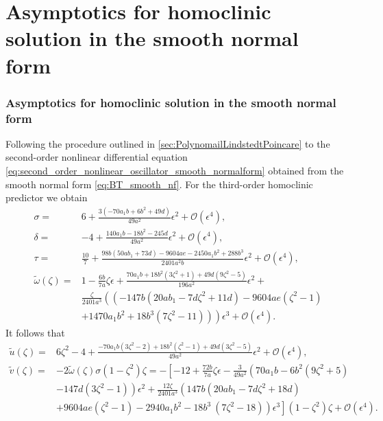 \ifthesis
\section{Asymptotics for homoclinic solution in the smooth normal form}
\else
\subsubsection{Asymptotics for homoclinic solution in the smooth normal form}
\fi
\label{sec:asymptotics-for-homoclinic-solution-for-the-smooth-normal-form}
Following the procedure outlined in \cref{sec:PolynomailLindstedtPoincare} to
the second-order nonlinear differential equation
\cref{eq:second_order_nonlinear_oscillator_smooth_normalform} obtained from the
smooth normal form \cref{eq:BT_smooth_nf}. For the third-order homoclinic
predictor we obtain
\begin{align}
				\sigma ={}& 6 + \frac{3 \left(-70 a_1 b+6 b^2+49 d\right)}{49 a^2} \epsilon^2
                    + \mathcal{O}(\epsilon^4),
				\nonumber \\
				\delta ={}& -4 + \frac{140 a_1 b-18 b^2-245 d}{49 a^2} \epsilon^2
                    + \mathcal{O}(\epsilon^4),
				\nonumber \\
				\label{eq:tau_smooth}
				\tau   ={}& \frac{10}{7} + \frac{98 b (50 a b_1+73 d)-9604 a e-2450 a_1 b^2+288 b^3}{2401 a^2 b} \epsilon^2
								+ \mathcal{O}(\epsilon^4), \\
				\tilde \omega(\zeta) ={}& 1 - \frac{6b}{7a}\zeta  \epsilon	+ 
				\frac{70 a_1 b+18 b^2 \left(3 \zeta ^2+1\right)+49 d \left(9 \zeta ^2-5\right)}{196 a^2} \epsilon^2 +
				\nonumber \\
        & \frac{\zeta}{2401 a^3} \left( \left(-147 b \left(20 a b_1-7 d
        \zeta ^2+11 d\right)-9604 a e \left(\zeta ^2-1\right) \right. \right. \nonumber \\
        & \left. \left. +1470 a_1 b^2+18 b^3 \left(7 \zeta ^2-11\right)\right) \right)\epsilon^3 + \mathcal{O}(\epsilon^4)
        \nonumber.
\end{align}
It follows that
\begin{align}
    \label{eq:third_order_uhat_smooth}
    \tilde {u}(\zeta) 
    ={}& 6 \zeta ^2-4 + \frac{-70 a_1 b \left(3 \zeta ^2-2\right)+18 b^2 \left(\zeta
    ^2-1\right)+49 d \left(3 \zeta ^2-5\right)}{49 a^2} \epsilon^2 
        + \mathcal{O}(\epsilon^4), \\
    \label{eq:third_order_vhat_smooth}
	\tilde  v(\zeta) 
  ={}& -2 \tilde\omega(\zeta) \sigma (1-\zeta^2)\zeta
	= -\left[ -12 + \frac{72b}{7a} \zeta \epsilon
			 - \frac{3}{49 a^2} \left(70 a_1 b-6 b^2 \left(9 \zeta ^2+5\right)
       \right. \right. \\
     & \left. -147 d \left(3 \zeta ^2-1\right)\right)\epsilon^2 + \frac{12
         \zeta}{2401 a^3}  \left(147 b \left(20 a b_1-7 d \zeta ^2+18
         d\right) \right. \nonumber \\
    & \left. \left. + 9604 a e \left(\zeta ^2-1\right)-2940 a_1 b^2-18 b^3 \
\left(7 \zeta ^2-18\right)\right) \epsilon^3 \right]
     (1-\zeta^2) \zeta + \mathcal{O}(\epsilon^4) \nonumber.
\end{align}

